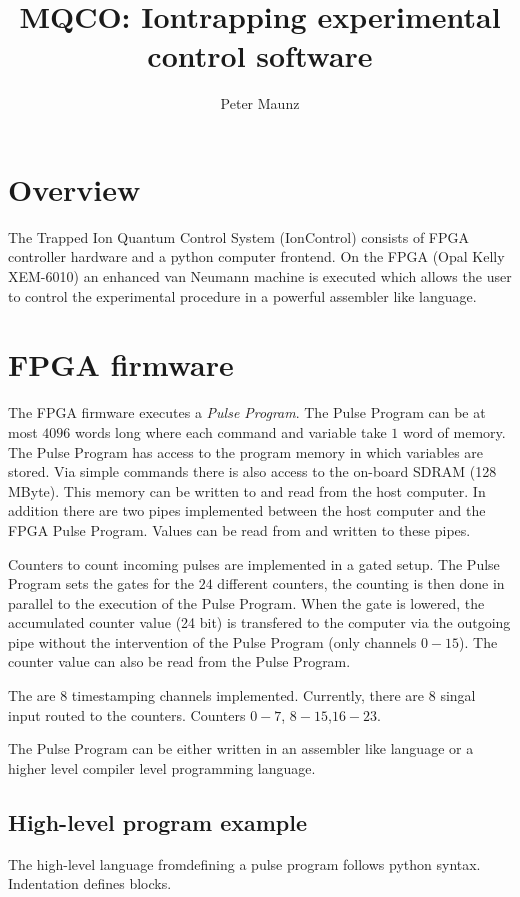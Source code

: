 \documentclass[11pt]{scrartcl}
\author{Peter Maunz}
\title{MQCO: Iontrapping experimental control software}
\begin{document}
\maketitle

\section{Overview}
The Trapped Ion Quantum Control System (IonControl) consists of FPGA controller hardware and a python computer frontend. On the FPGA (Opal Kelly XEM-6010) an enhanced van Neumann machine is executed which allows the user to control the experimental procedure in a powerful assembler like language.

\section{FPGA firmware}

%

The FPGA firmware executes a {\it Pulse Program}. The Pulse Program can be at most $4096$ words long where each command and variable take $1$ word of memory. The Pulse Program has access to the program memory in which variables are stored. Via simple commands there is also access to the on-board SDRAM (128 MByte). This memory can be written to and read from the host computer. In addition there are two pipes implemented between the host computer and the FPGA Pulse Program. Values can be read from and written to these pipes.

Counters to count incoming pulses are implemented in a gated setup. The Pulse Program sets the gates for the $24$ different counters, the counting is then done in parallel to the execution of the Pulse Program. When the gate is lowered, the accumulated counter value (24 bit) is transfered to the computer via the outgoing pipe without the intervention of the Pulse Program (only channels $0-15$). The counter value can also be read from the Pulse Program.

The are $8$ timestamping channels implemented. Currently, there are $8$ singal input routed to the counters. Counters $0-7$, $8-15$,$16-23$. 

The Pulse Program can be either written in an assembler like language or a higher level compiler level programming language.

\subsection{High-level program example}
The high-level language fromdefining a pulse program follows python syntax. Indentation defines blocks.
\end{document}
